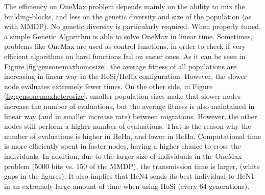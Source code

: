 \documentclass[final,1p,times]{elsarticle}
\begin{document}
The efficiency on OneMax problem depends mainly on the ability to mix
the building-blocks, and less on the genetic diversity and size of the
population (as with MMDP). No genetic diversity is particularly
required. When properly tuned, a simple Genetic Algorithm is able to
solve OneMax in linear time. Sometimes, problems like OneMax are used
as control functions, in order to check if very efficient algorithms
on hard functions fail on easier ones. As it can be seen in Figure
\ref{fig:gensonemaxhomosize}, the average fitness of all populations
are increasing in linear way in the HoSi/HeHa configuration. However,
the slower node evaluates extremely fewer times.  On the other
side, in Figure \ref{fig:gensonemaxheterosize}, smaller population
sizes make that slower nodes increase the number of evaluations,
but the average fitness is also maintained in linear way (and in
smaller increase rate) between migrations. However, the other
nodes still perform a higher number of evaluations. That is the
reason why the number of evaluations is higher in HeHa, and lower in
HoHa. Computational time is more efficiently spent in faster nodes,
having a higher chance to cross the individuals. In addition, due to
the larger size of  individuals in the OneMax problem (5000 bits
vs. 150 of the MMDP), the transmission time is larger, (white gaps in the
figures). It also implies that HeN4 sends its best individual to
HeN1 in an extremely large amount of time when using HoSi (every 64
generations). 

\begin{table}
\centering
\caption{Results for the OneMax problem.}
\label{tab:onemaxresults}
\end{table}
\end{document}
